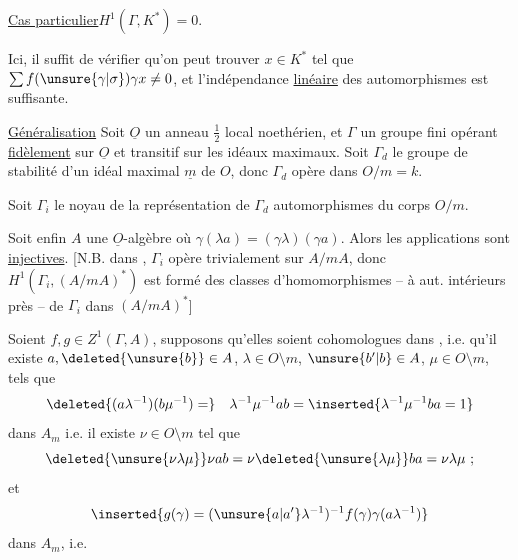  \uline{Cas particulier}\qquad\uline{$H^1(\Gamma,K^*)=0$}.

Ici, il suffit de vérifier qu'on peut trouver $x\in K^*$ tel que $\sum f(\unsure{\gamma|\sigma})\gamma x\ne0$, et l'indépendance \uline{linéaire} des automorphismes est suffisante.

\uline{Généralisation} Soit $\underline{O}$ un anneau $\frac12$ local noethérien, et $\Gamma$ un groupe fini opérant \uline{fidèlement} sur $\underline{O}$ et  transitif sur les idéaux maximaux. Soit $\Gamma_d$ le  groupe de stabilité d'un idéal maximal $\underline{m}$ de $O$, donc $\Gamma_d$ opère dans $O/m=k$.

Soit $\Gamma_i$ le noyau de la représentation de $\Gamma_d$  automorphismes du corps $O/m$.

Soit enfin $A$ une $\underline{O}$-algèbre   où    $\gamma(\lambda a)=(\gamma\lambda)(\gamma a)$. Alors les applications
sont \uline{injectives}. [N.B.  dans ,  $\Gamma_i$ opère trivialement sur $A/mA$, donc $H^1(\Gamma_i,(A/mA)^*)$ est formé des classes d'homomorphismes -- à aut. intérieurs  près -- de $\Gamma_i$ dans $(A/mA)^*$]

Soient $f,g\in Z^1(\Gamma,A)$, supposons qu'elles soient cohomologues dans , i.e. qu'il existe $a,\deleted{\unsure{b}}\in A$, $\lambda\in O\setminus m$,  $\unsure{b'|b}\in A$, $\mu\in O\setminus m$, tels que
\[
\deleted{(a\lambda^{-1})(b\mu^{-1})=}\quad\lambda^{-1}\mu^{-1}ab=\inserted{\lambda^{-1}\mu^{-1}ba=1}
\]
dans $A_m$ i.e. il existe $\nu\in O\setminus m$ tel que
\[
\deleted{\unsure{\nu\lambda\mu}}\nu ab=\nu\deleted{\unsure{\lambda\mu}}ba=\nu\lambda\mu\ ;
\]
et 
\[
\inserted{g(\gamma)=(\unsure{a|a'}\lambda^{-1})^{-1}f(\gamma)\gamma(a\lambda^{-1})}
\]
dans $A_m$, i.e.

